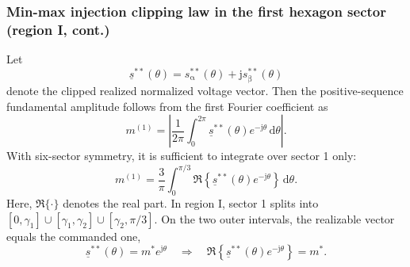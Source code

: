 \begin{frame}
    \frametitle{Min-max injection clipping law in the first hexagon sector (region I, cont.)}
    Let
    \begin{equation}
        \underline{s}^{**}(\theta) = s_{\upalpha}^{**}(\theta) + \mathrm{j}s_{\upbeta}^{**}(\theta)
    \end{equation}
    denote the clipped realized normalized voltage vector. \pause Then the positive-sequence fundamental amplitude follows from the first Fourier coefficient as
    \begin{equation}
        m^{(1)} = \left|\frac{1}{2\pi}\int_{0}^{2\pi} \underline{s}^{**}(\theta)e^{-\mathrm{j}\theta}\,\mathrm{d}\theta\right|.
    \end{equation}\pause
    With six-sector symmetry, it is sufficient to integrate over sector 1 only:
    \begin{equation}
        m^{(1)} = \frac{3}{\pi}\int_{0}^{\pi/3} \Re\!\left\{\underline{s}^{**}(\theta)e^{-\mathrm{j}\theta}\right\}\,\mathrm{d}\theta.
    \end{equation}\pause
    Here, $\Re\{\cdot\}$ denotes the real part. \pause In region I, sector 1 splits into $[0,\gamma_1] \cup [\gamma_1,\gamma_2] \cup [\gamma_2,\pi/3]$. \pause
    On the two outer intervals, the realizable vector equals the commanded one,
    \begin{equation}
        \underline{s}^{**}(\theta) = m^*e^{\mathrm{j}\theta}
        \quad \Rightarrow \quad
        \Re\!\left\{\underline{s}^{**}(\theta)e^{-\mathrm{j}\theta}\right\} = m^*.
    \end{equation}
\end{frame}

